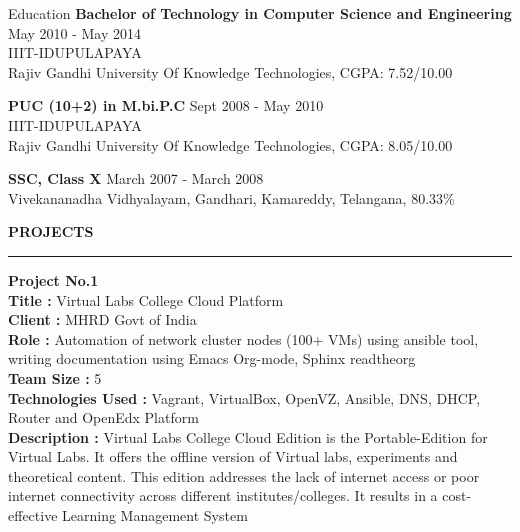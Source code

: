\documentclass{resume} %
\begin{document}

\begin{rSection}{Education}
  {\bf Bachelor of Technology in Computer Science and Engineering} \hfill {May 2010 - May 2014}
  \\ 
  IIIT-IDUPULAPAYA
  \\
  Rajiv Gandhi University Of Knowledge Technologies,  CGPA: 7.52/10.00  
  
  {\bf PUC (10+2) in M.bi.P.C} \hfill {Sept 2008 - May 2010}
  \\
  IIIT-IDUPULAPAYA
  \\
  Rajiv Gandhi University Of Knowledge Technologies,  CGPA: 8.05/10.00  
  
  {\textbf{SSC, Class X}}  \hfill March 2007 - March  2008 \\
  Vivekananadha Vidhyalayam, Gandhari, Kamareddy, Telangana, 80.33\% 

\end{rSection}

\break


\textbf{PROJECTS}
\sectionlineskip \\ \hrule \textbf {Project No.1} \\ \textbf{Title : }
Virtual Labs College Cloud Platform \\ \textbf{Client : } MHRD Govt of
India \\ \textbf{Role : } Automation of network cluster nodes (100+
VMs) using ansible tool, writing documentation using Emacs Org-mode,
Sphinx readtheorg\\ \textbf{Team Size : } 5 \\ \textbf{Technologies
  Used :} Vagrant, VirtualBox, OpenVZ, Ansible, DNS, DHCP, Router and
OpenEdx Platform \\ \textbf{Description :} Virtual Labs College Cloud
Edition is the Portable-Edition for Virtual Labs. It offers the
offline version of Virtual labs, experiments and theoretical
content. This edition addresses the lack of internet access or poor
internet connectivity across different institutes/colleges. It results
in a cost-effective Learning Management System
\end{document}
